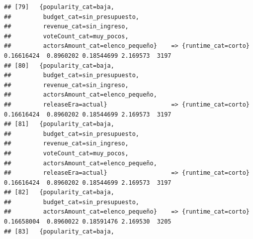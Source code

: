 \documentclass[
]{article}
\begin{document}
\begin{verbatim}
## [79]   {popularity_cat=baja,                                                                                                    
##         budget_cat=sin_presupuesto,                                                                                             
##         revenue_cat=sin_ingreso,                                                                                                
##         voteCount_cat=muy_pocos,                                                                                                
##         actorsAmount_cat=elenco_pequeño}    => {runtime_cat=corto}               0.16616424  0.8960202 0.18544699 2.169573  3197
## [80]   {popularity_cat=baja,                                                                                                    
##         budget_cat=sin_presupuesto,                                                                                             
##         revenue_cat=sin_ingreso,                                                                                                
##         actorsAmount_cat=elenco_pequeño,                                                                                        
##         releaseEra=actual}                  => {runtime_cat=corto}               0.16616424  0.8960202 0.18544699 2.169573  3197
## [81]   {popularity_cat=baja,                                                                                                    
##         budget_cat=sin_presupuesto,                                                                                             
##         revenue_cat=sin_ingreso,                                                                                                
##         voteCount_cat=muy_pocos,                                                                                                
##         actorsAmount_cat=elenco_pequeño,                                                                                        
##         releaseEra=actual}                  => {runtime_cat=corto}               0.16616424  0.8960202 0.18544699 2.169573  3197
## [82]   {popularity_cat=baja,                                                                                                    
##         budget_cat=sin_presupuesto,                                                                                             
##         actorsAmount_cat=elenco_pequeño}    => {runtime_cat=corto}               0.16658004  0.8960022 0.18591476 2.169530  3205
## [83]   {popularity_cat=baja,                                                                                                    

\end{verbatim}
\end{document}
